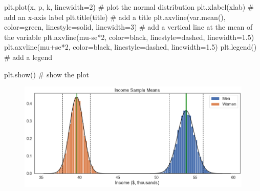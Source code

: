 \documentclass[
  letterpaper,
  DIV=11,
  numbers=noendperiod]{scrreprt}
\newenvironment{Shaded}{\begin{snugshade}}{\end{snugshade}}
\newcommand{\CommentTok}[1]{\textcolor[rgb]{0.37,0.37,0.37}{#1}}
\newcommand{\DecValTok}[1]{\textcolor[rgb]{0.68,0.00,0.00}{#1}}
\newcommand{\FloatTok}[1]{\textcolor[rgb]{0.68,0.00,0.00}{#1}}
\newcommand{\NormalTok}[1]{\textcolor[rgb]{0.00,0.23,0.31}{#1}}
\newcommand{\OperatorTok}[1]{\textcolor[rgb]{0.37,0.37,0.37}{#1}}
\newcommand{\StringTok}[1]{\textcolor[rgb]{0.13,0.47,0.30}{#1}}
\begin{document}
\begin{Shaded}
\begin{Highlighting}[]
\NormalTok{            plt.plot(x, p, }\StringTok{\textquotesingle{}k\textquotesingle{}}\NormalTok{, linewidth}\OperatorTok{=}\DecValTok{2}\NormalTok{) }\CommentTok{\# plot the normal distribution}
\NormalTok{            plt.xlabel(xlab) }\CommentTok{\# add an x{-}axis label}
\NormalTok{            plt.title(title) }\CommentTok{\# add a title}
\NormalTok{            plt.axvline(var.mean(), color}\OperatorTok{=}\StringTok{\textquotesingle{}green\textquotesingle{}}\NormalTok{, linestyle}\OperatorTok{=}\StringTok{\textquotesingle{}solid\textquotesingle{}}\NormalTok{, linewidth}\OperatorTok{=}\DecValTok{3}\NormalTok{) }\CommentTok{\# add a vertical line at the mean of the variable}
\NormalTok{            plt.axvline(mu}\OperatorTok{{-}}\NormalTok{se}\OperatorTok{*}\DecValTok{2}\NormalTok{, color}\OperatorTok{=}\StringTok{\textquotesingle{}black\textquotesingle{}}\NormalTok{, linestyle}\OperatorTok{=}\StringTok{\textquotesingle{}dashed\textquotesingle{}}\NormalTok{, linewidth}\OperatorTok{=}\FloatTok{1.5}\NormalTok{)}
\NormalTok{            plt.axvline(mu}\OperatorTok{+}\NormalTok{se}\OperatorTok{*}\DecValTok{2}\NormalTok{, color}\OperatorTok{=}\StringTok{\textquotesingle{}black\textquotesingle{}}\NormalTok{, linestyle}\OperatorTok{=}\StringTok{\textquotesingle{}dashed\textquotesingle{}}\NormalTok{, linewidth}\OperatorTok{=}\FloatTok{1.5}\NormalTok{)}
\NormalTok{            plt.legend() }\CommentTok{\# add a legend}
            
\NormalTok{        plt.show()  }\CommentTok{\# show the plot }
\end{Highlighting}
\end{Shaded}

\begin{Shaded}
\end{Shaded}

\begin{figure}[H]

{\centering \includegraphics{notebooks/W07. Distributions and Basic Statistics_files/figure-pdf/cell-29-output-1.png}

}

\end{figure}
\end{document}
